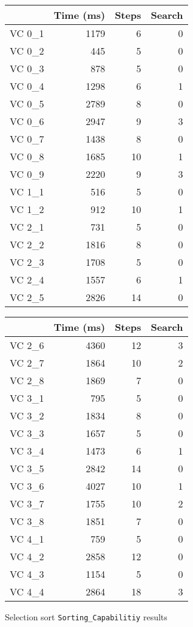 \begin{figure}
	\centering
	\begin{tabular}{lrrr}
		\toprule
			& Time (ms)	& Steps	& Search \\
		\midrule
		VC 0\_1	& 1179		& 6 	& 0     \\
		VC 0\_2	& 445		& 5 	& 0     \\
		VC 0\_3	& 878		& 5 	& 0     \\
		VC 0\_4	& 1298		& 6 	& 1     \\
		VC 0\_5	& 2789		& 8	& 0     \\
		VC 0\_6	& 2947		& 9 	& 3     \\
		VC 0\_7	& 1438		& 8 	& 0     \\
		VC 0\_8	& 1685		& 10	& 1     \\
		VC 0\_9	& 2220		& 9 	& 3     \\
		VC 1\_1	& 516 		& 5 	& 0     \\
		VC 1\_2	& 912 		& 10	& 1     \\
		VC 2\_1	& 731 		& 5 	& 0     \\
		VC 2\_2	& 1816		& 8 	& 0     \\
		VC 2\_3	& 1708		& 5 	& 0     \\
		VC 2\_4	& 1557		& 6 	& 1     \\
		VC 2\_5	& 2826		& 14	& 0     \\
		\bottomrule
	\end{tabular}
	\qquad
	\begin{tabular}{lrrr}
		\toprule
			& Time (ms)	& Steps	& Search \\
		\midrule
		VC 2\_6	& 4360		& 12	& 3     \\
		VC 2\_7	& 1864		& 10	& 2     \\
		VC 2\_8	& 1869		& 7 	& 0     \\
		VC 3\_1	& 795 		& 5 	& 0     \\
		VC 3\_2	& 1834		& 8 	& 0     \\
		VC 3\_3	& 1657		& 5 	& 0     \\
		VC 3\_4	& 1473		& 6 	& 1     \\
		VC 3\_5	& 2842		& 14	& 0     \\
		VC 3\_6	& 4027		& 10	& 1     \\
		VC 3\_7	& 1755		& 10	& 2     \\
		VC 3\_8	& 1851		& 7 	& 0     \\
		VC 4\_1	& 759 		& 5 	& 0     \\
		VC 4\_2	& 2858		& 12	& 0     \\
		VC 4\_3	& 1154		& 5 	& 0     \\
		VC 4\_4	& 2864		& 18	& 3     \\
		\bottomrule
	\end{tabular}
	\caption{Selection sort \texttt{Sorting\_Capabilitiy} results\label{fig:sortingResults}}
\end{figure}

